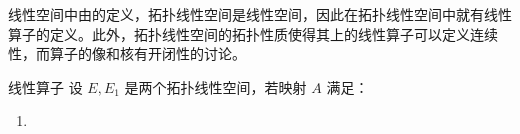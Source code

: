 
线性空间中由的定义，拓扑线性空间是线性空间，因此在拓扑线性空间中就有线性算子的定义。此外，拓扑线性空间的拓扑性质使得其上的线性算子可以定义连续性，而算子的像和核有开闭性的讨论。

\begin{definition}{线性算子}
设 $E,E_1$ 是两个拓扑线性空间，若映射 $A$ 满足：
\begin{enumerate}
\item 
\end{enumerate}

  
\end{definition}

